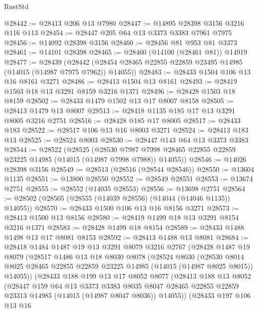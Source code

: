 \begin{lexlean}{RustStd}
\begin{coremodule}
@28442 := @28413 @206 @13 @7980
@28447 := @14895 @28398 @3156 @3216 @116 @113
@28454 := @28447 @205 @64 @13 @3373 @3383 @7961 @7975
@28456 := @14092 @28398 @3156
@28460 := @28456 @81 @953 @81 @3373
@28461 := @14101 @28398
@28465 := @28460 (@14100 (@28461 @81)) @14919
@28477 := @28439
    (@28442 (@28454 @28465 @22855 @22859 @23495 @14985 (@14015 (@14987 @7975 @7962)) @14055))
@28483 := @28433 @1504 @106 @13 @16 @8161 @3271
@28486 := @28413 @1504 @13 @8161
@28493 := @28419 @1503 @18 @13 @3291 @8159 @3216 @1371
@28496 := @28428 @1503 @18 @8159
@28502 := @28433 @1479 @1502 @13 @17 @8007 @8158
@28505 := @28413 @1479 @13 @8007
@28513 := @28418 @1135 @185 @17 @13 @3291 @8005 @3216 @2751
@28516 := @28428 @185 @17 @8005
@28517 := @28433 @183
@28522 := @28517 @106 @13 @16 @8003 @3271
@28524 := @28413 @183 @13
@28525 := @28524 @8003
@28530 := @28447 @143 @64 @13 @3373 @3383
@28544 := @28522
    (@28525
      (@28530 @7987 @7998 @28465 @22855 @22859 @23225 @14985 (@14015 (@14987 @7998 @7988)) @14055))
@28546 := @14026 @28398 @3156
@28549 := @28513 (@28516 (@28544 @28546))
@28550 := @13604 @1135
@28551 := @13800 @28550
@28552 := @28549 @28551
@28553 := @13674 @2751
@28555 := @28552 (@14035 @28553)
@28556 := @13698 @2751
@28564 := @28502 (@28505 (@28555 (@14039 @28556) (@14044 (@14046 @1135)) @14055))
@28570 := @28433 @1500 @106 @13 @16 @8156 @3271
@28573 := @28413 @1500 @13 @8156
@28580 := @28419 @1499 @18 @13 @3291 @8154 @3216 @1371
@28583 := @28428 @1499 @18 @8154
@28589 := @28433 @1488 @1498 @13 @17 @8081 @8153
@28592 := @28413 @1488 @13 @8081
@28684 := @28418
    @1484
    @1487
    @19
    @13
    @3291
    @8079
    @3216
    @2767
    (@28428
      @1487
      @19
      @8079
      (@28517
        @1486
        @13
        @18
        @8030
        @8078
        (@28524
          @8030
          (@28530
            @8014
            @8025
            @28465
            @22855
            @22859
            @23225
            @14985
            (@14015 (@14987 @8025 @8015))
            @14055))
        (@28433
          @188
          @199
          @13
          @17
          @8052
          @8077
          (@28413
            @188
            @13
            @8052
            (@28447
              @159
              @64
              @13
              @3373
              @3383
              @8035
              @8047
              @28465
              @22855
              @22859
              @23313
              @14985
              (@14015 (@14987 @8047 @8036))
              @14055))
          (@28433
            @197
            @106
            @13
            @16

\end{coremodule}
\end{lexlean}
